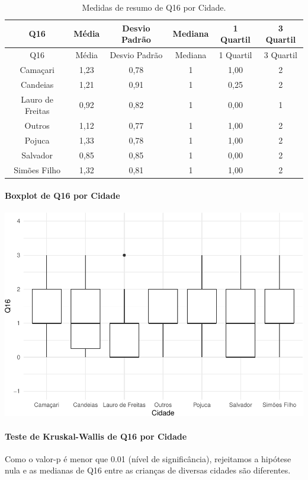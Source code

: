 \documentclass[]{article}
\let\oldparagraph\paragraph
\renewcommand{\paragraph}[1]{\oldparagraph{#1}\mbox{}}
\begin{document}
\begin{longtable}[]{@{}cccccc@{}}
\caption{\label{tab:unnamed-chunk-134}Medidas de resumo de Q16 por Cidade.}\tabularnewline
\toprule
Q16 & Média & Desvio Padrão & Mediana & 1 Quartil & 3 Quartil\tabularnewline
\midrule
\endfirsthead
\toprule
Q16 & Média & Desvio Padrão & Mediana & 1 Quartil & 3 Quartil\tabularnewline
\midrule
\endhead
Camaçari & 1,23 & 0,78 & 1 & 1,00 & 2\tabularnewline
Candeias & 1,21 & 0,91 & 1 & 0,25 & 2\tabularnewline
Lauro de Freitas & 0,92 & 0,82 & 1 & 0,00 & 1\tabularnewline
Outros & 1,12 & 0,77 & 1 & 1,00 & 2\tabularnewline
Pojuca & 1,33 & 0,78 & 1 & 1,00 & 2\tabularnewline
Salvador & 0,85 & 0,85 & 1 & 0,00 & 2\tabularnewline
Simões Filho & 1,32 & 0,81 & 1 & 1,00 & 2\tabularnewline
\bottomrule
\end{longtable}

\hypertarget{boxplot-de-q16-por-cidade}{%
\paragraph{Boxplot de Q16 por Cidade}\label{boxplot-de-q16-por-cidade}}

\begin{center}\includegraphics[width=0.75\linewidth]{relatorio_covid19_files/figure-latex/unnamed-chunk-135-1} \end{center}

\hypertarget{teste-de-kruskal-wallis-de-q16-por-cidade}{%
\paragraph{Teste de Kruskal-Wallis de Q16 por Cidade}\label{teste-de-kruskal-wallis-de-q16-por-cidade}}

Como o valor-p é menor que 0.01 (nível de significância), rejeitamos a hipótese nula e as medianas de Q16 entre as crianças de diversas cidades são diferentes.
\end{document}
